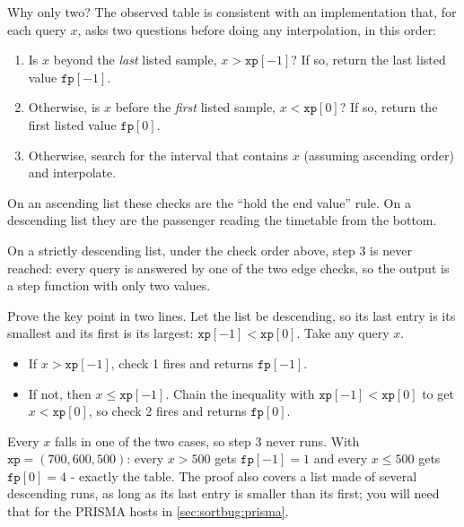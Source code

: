 Why only two? The observed table is consistent with an implementation that, for each query $x$, asks two
questions before doing any interpolation, in this order:
\begin{enumerate}
\item Is $x$ beyond the \emph{last} listed sample, $x > \mathtt{xp}[-1]$? If so, return the last listed value
  $\mathtt{fp}[-1]$.
\item Otherwise, is $x$ before the \emph{first} listed sample, $x < \mathtt{xp}[0]$? If so, return the first
  listed value $\mathtt{fp}[0]$.
\item Otherwise, search for the interval that contains $x$ (assuming ascending order) and interpolate.
\end{enumerate}
On an ascending list these checks are the ``hold the end value'' rule. On a descending list they are the
passenger reading the timetable from the bottom.

\begin{keypoint}
On a strictly descending list, under the check order above, step 3 is never reached: every query is answered
by one of the two edge checks, so the output is a step function with only two values.
\end{keypoint}

Prove the key point in two lines. Let the list be descending, so its last entry is its smallest and its first
is its largest: $\mathtt{xp}[-1] < \mathtt{xp}[0]$. Take any query $x$.
\begin{itemize}
\item If $x > \mathtt{xp}[-1]$, check 1 fires and returns $\mathtt{fp}[-1]$.
\item If not, then $x \le \mathtt{xp}[-1]$. Chain the inequality with $\mathtt{xp}[-1] < \mathtt{xp}[0]$ to
  get $x < \mathtt{xp}[0]$, so check 2 fires and returns $\mathtt{fp}[0]$.
\end{itemize}
Every $x$ falls in one of the two cases, so step 3 never runs. With $\mathtt{xp} = (700, 600, 500)$: every
$x > 500$ gets $\mathtt{fp}[-1] = 1$ and every $x \le 500$ gets $\mathtt{fp}[0] = 4$ - exactly the table.
The proof also covers a list made of several descending runs, as long as its last entry is smaller than its
first; you will need that for the PRISMA hosts in \cref{sec:sortbug:prisma}.


